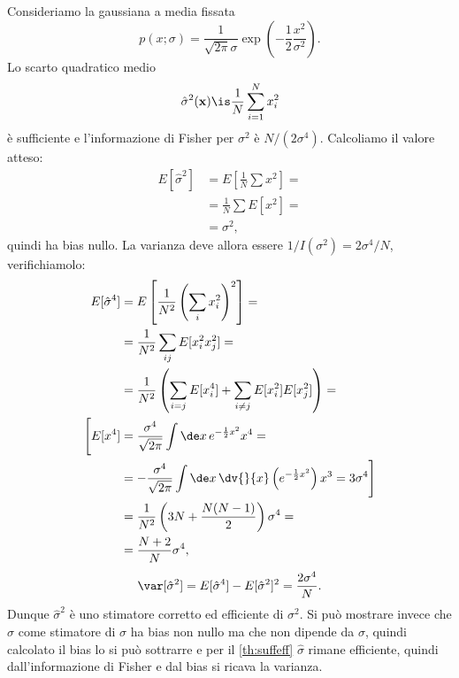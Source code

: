 \begin{example}
	Consideriamo la gaussiana a media fissata
	\begin{equation*}
		p(x;\sigma)
		= \frac1{\sqrt{2\pi}\sigma} \exp\left(-\frac12 \frac{x^2}{\sigma^2}\right).
	\end{equation*}
	Lo scarto quadratico medio
	\begin{equation*}
		\hat\sigma^2(\mathbf x)
		\is \frac1N \sum_{i=1}^N x_i^2
	\end{equation*}
	è sufficiente e l'informazione di Fisher per $\sigma^2$ è $N/(2\sigma^4)$.
	Calcoliamo il valore atteso:
	\begin{align*}
		E[\hat\sigma^2]
		&= E \left[ \frac 1N \sum x^2 \right] = \\
		&= \frac 1N \sum E[x^2] = \\
		&= \sigma^2,
	\end{align*}
	quindi ha bias nullo.
	La varianza deve allora essere $1/I(\sigma^2)=2\sigma^4/N$, verifichiamolo:
	\begin{align*}
		E[\hat\sigma^4]
		&= E \left[ \frac1{N^2}\left(\sum_ix_i^2\right)^2 \right] = \\
		&= \frac1{N^2} \sum_{ij} E[x_i^2x_j^2] = \\
		&= \frac1{N^2} \left( \sum_{i=j} E[x_i^4] + \sum_{i\neq j} E[x_i^2]E[x_j^2] \right) = \\
		\Bigg[ E[x^4]
		&= \frac{\sigma^4}{\sqrt{2\pi}} \int\de x\, e^{-\frac12 x^2} x^4 = \\
		&= - \frac{\sigma^4}{\sqrt{2\pi}} \int\de x\, \dv{}{x} \left(e^{-\frac12x^2}\right) x^3
		= 3 \sigma^4 \Bigg] \\
		&= \frac1{N^2} \left( 3N + \frac{N(N-1)}2 \right) \sigma^4 = \\
		&= \frac{N+2}N \sigma^4,
	\end{align*}
	\begin{equation*}
		\var[\hat\sigma^2]
		= E[\hat\sigma^4] - E[\hat\sigma^2]^2
		= \frac{2\sigma^4}N.
	\end{equation*}
	Dunque $\hat\sigma^2$ è uno stimatore corretto ed efficiente di $\sigma^2$.
	Si può mostrare invece che $\hat\sigma$ come stimatore di $\sigma$ ha bias non nullo
	ma che non dipende da $\sigma$,
	quindi calcolato il bias lo si può sottrarre e per il \autoref{th:suffeff} $\hat\sigma$ rimane efficiente,
	quindi dall'informazione di Fisher e dal bias si ricava la varianza.
\end{example}

